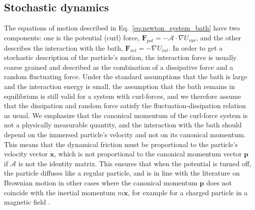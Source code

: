 \subsection{Stochastic dynamics}
The equations of motion described in Eq.~\ref{eq:newton_system_bath} have two components: one is the potential (curl) force, $\mathbf F_{pot}=-\mathcal{A}\cdot\nabla U_{sys}$, and the other describes the interaction with the bath, $\mathbf F_{int}=-\nabla U_{int}$. In order to get a stochastic description of the particle's motion, the interaction force is usually coarse grained and described as the combination of a dissipative force and a random fluctuating force. Under the standard assumptions that the bath is large and the interaction energy is small, the assumption that the bath remains in equilibrium is still valid for a system with curl-forces, and we therefore assume that the dissipation and random force satisfy the fluctuation-dissipation relation as usual. 
We emphasize that the canonical momentum of the curl-force system is not a physically measurable quantity, and the interaction with the bath should depend on the immersed particle's velocity and not on its canonical momentum. This means that the dynamical friction must be proportional to the particle's velocity vector $\dot{\mathbf{x}}$, which is not proportional to the canonical momentum vector $\mathbf{p}$ if $\mathcal{A}$ is not the identity matrix. This ensures that when the potential is turned off, the particle diffuses like a regular particle, and is in line with the literature on Brownian motion in other cases where the canonical momentum $\mathbf{p}$ does not coincide with the inertial momentum $m\dot{\mathbf{x}}$, for example for a charged particle in a magnetic field \cite{taylor1961diffusion, kurcsunoglu1963brownian, czopnik2001brownian, simoes2005kramers, lisy2013brownian}.

